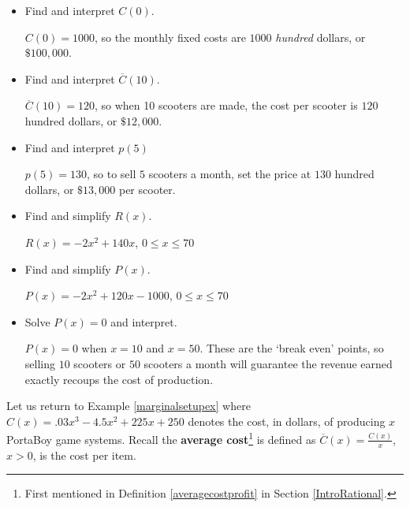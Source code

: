 \documentclass{ximera}
\begin{document}
\begin{question}
\begin{problem}
\begin{itemize}

\item  Find and interpret $C(0)$.

\begin{solution}
    $C(0) = 1000$, so the monthly fixed costs are $1000$ \textit{hundred} dollars, or $\$100,\!000$.
\end{solution}
\item  Find and interpret $\overline{C}(10)$.

\begin{solution}
    $\overline{C}(10) = 120$, so when 10 scooters are made, the cost per scooter is $120$ hundred dollars, or $\$12,\!000$.
\end{solution}
\item  Find and interpret $p(5)$

\begin{solution}
    $p(5) = 130$, so to sell $5$ scooters a month, set the price at $130$ hundred dollars, or $\$13,\!000$ per scooter.
\end{solution}
\item  Find and simplify $R(x)$.

\begin{solution}
    $R(x) = -2x^2+140x$, $0 \leq x \leq 70$
\end{solution}
\item  Find and simplify $P(x)$.

\begin{solution}
    $P(x) = -2x^2+120x-1000$, $0 \leq x \leq 70$
\end{solution}
\item  Solve $P(x) = 0$ and interpret.

\begin{solution}
    $P(x) = 0$ when $x = 10$ and $x=50$.  These are the `break even' points, so selling $10$ scooters or $50$ scooters a month will guarantee the revenue earned exactly recoups the cost of production.
\end{solution}
\end{itemize}
\end{problem} 

\begin{problem}

\label{AverageCostMarginalCostExercise} Let us return to Example \ref{marginalsetupex} where  $C(x) = .03x^{3} - 4.5x^{2} + 225x + 250$ denotes the cost, in dollars,  of producing $x$ PortaBoy game systems. Recall the \textbf{average cost}\footnote{First mentioned in Definition \ref{averagecostprofit} in Section \ref{IntroRational}.} is defined as $\overline{C}(x) = \frac{C(x)}{x}$, $x > 0$,  is the cost per item.


\end{problem}
\end{question}
\end{document}
